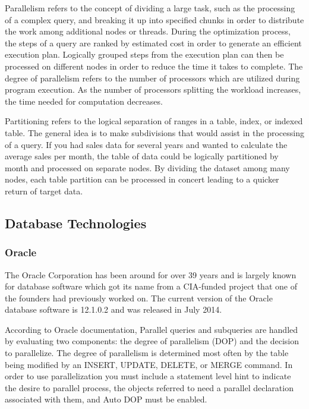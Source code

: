 \documentclass[draftclsnofoot, onecolumn, compsoc, 10pt]{IEEEtran}
\begin{document}
Parallelism refers to the concept of dividing a large task, such as the processing of a complex query, and breaking it up into specified chunks in order to distribute the work among additional nodes or threads.
During the optimization process, the steps of a query are ranked by estimated cost in order to generate an efficient execution plan.
Logically grouped steps from the execution plan can then be processed on different nodes in order to reduce the time it takes to complete.
The degree of parallelism refers to the number of processors which are utilized during program execution.
As the number of processors splitting the workload increases, the time needed for computation decreases.

Partitioning refers to the logical separation of ranges in a table, index, or indexed table.
The general idea is to make subdivisions that would assist in the processing of a query.
If you had sales data for several years and wanted to calculate the average sales per month, the table of data could be logically partitioned by month and processed on separate nodes.
By dividing the dataset among many nodes, each table partition can be processed in concert leading to a quicker return of target data.

\subsection{Database Technologies}

\subsubsection{Oracle}
The Oracle Corporation has been around for over 39 years and is largely known for database software which got its name from a CIA-funded project that one of the founders had previously worked on.
The current version of the Oracle database software is 12.1.0.2 and was released in July 2014.


According to Oracle documentation, Parallel queries and subqueries are handled by evaluating two components: the degree of parallelism (DOP) and the decision to parallelize.
The degree of parallelism is determined most often by the table being modified by an INSERT, UPDATE, DELETE, or MERGE command.
In order to use parallelization you must include a statement level hint to indicate the desire to parallel process, the objects referred to need a parallel declaration associated with them, and Auto DOP must be enabled.
\end{document}
